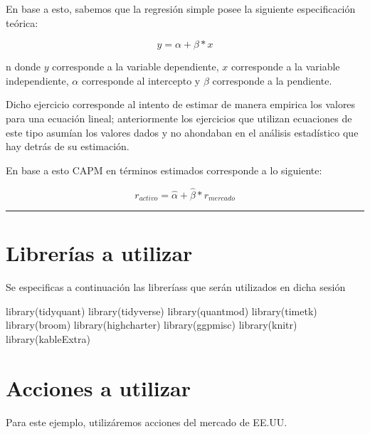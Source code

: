 \documentclass[
  letterpaper,
  DIV=11,
  numbers=noendperiod]{scrartcl}
\newenvironment{Shaded}{\begin{snugshade}}{\end{snugshade}}
\newcommand{\FunctionTok}[1]{\textcolor[rgb]{0.28,0.35,0.67}{#1}}
\newcommand{\NormalTok}[1]{\textcolor[rgb]{0.00,0.23,0.31}{#1}}
\begin{document}
En base a esto, sabemos que la regresión simple posee la siguiente
especificación teórica:

\[ y = \alpha + \beta * x \]

n donde \(y\) corresponde a la variable dependiente, \(x\) corresponde a
la variable independiente, \(\alpha\) corresponde al intercepto y
\(\beta\) corresponde a la pendiente.

Dicho ejercicio corresponde al intento de estimar de manera empirica los
valores para una ecuación lineal; anteriormente los ejercicios que
utilizan ecuaciones de este tipo asumían los valores dados y no
ahondaban en el análisis estadístico que hay detrás de su estimación.

En base a esto CAPM en términos estimados corresponde a lo siguiente:

\[
r_{activo} = \hat{\alpha} + \hat{\beta} * r_{mercado}
\]

\begin{center}\rule{0.5\linewidth}{0.5pt}\end{center}

\section{Librerías a utilizar}\label{libreruxedas-a-utilizar}

Se especificas a continuación las libreríass que serán utilizados en
dicha sesión

\begin{Shaded}
\begin{Highlighting}[]
\FunctionTok{library}\NormalTok{(tidyquant)}
\FunctionTok{library}\NormalTok{(tidyverse)}
\FunctionTok{library}\NormalTok{(quantmod)}
\FunctionTok{library}\NormalTok{(timetk)}
\FunctionTok{library}\NormalTok{(broom)}
\FunctionTok{library}\NormalTok{(highcharter)}
\FunctionTok{library}\NormalTok{(ggpmisc)}
\FunctionTok{library}\NormalTok{(knitr)}
\FunctionTok{library}\NormalTok{(kableExtra)}
\end{Highlighting}
\end{Shaded}

\section{Acciones a utilizar}\label{acciones-a-utilizar}

Para este ejemplo, utilizáremos acciones del mercado de EE.UU.
\end{document}
